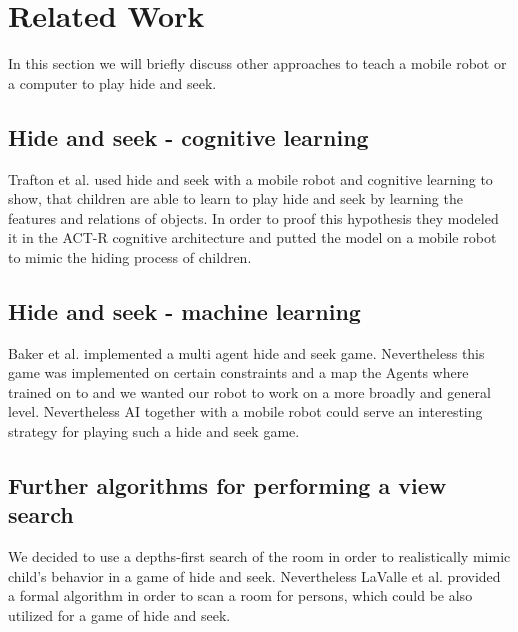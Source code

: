 \documentclass[conference]{IEEEtran}
\begin{document}
\section{Related Work}
In this section we will briefly discuss other approaches to teach a mobile robot or a computer to play hide and seek.\\
\subsection{Hide and seek - cognitive learning}
Trafton et al. \cite{b1} used hide and seek with a mobile robot and cognitive learning to show, that children are able to learn to play hide and seek 
by learning the features and relations of objects. In order to proof this hypothesis they modeled it in the ACT-R cognitive architecture and 
putted the model on a mobile robot to mimic the hiding process of children.
\subsection{Hide and seek - machine learning}
Baker et al. \cite{b2} implemented a multi agent hide and seek game. 
Nevertheless this game was implemented on certain constraints and a map the Agents where trained on to and we wanted our robot 
to work on a more broadly and general level. 
Nevertheless AI together with a mobile robot could serve an interesting strategy for playing such a hide and seek game.
\subsection{Further algorithms for performing a view search}
We decided to use a depths-first search of the room in order to realistically mimic child's behavior in a game of hide and seek.
Nevertheless LaValle et al. \cite{b3} provided a formal algorithm in order to scan a room for persons, which could be also utilized for a game of hide and seek.\\\\
\end{document}
